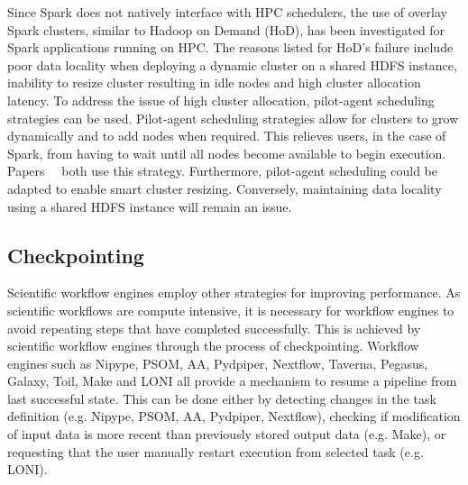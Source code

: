             Since Spark does not natively interface with HPC schedulers, the use
            of overlay Spark clusters, similar to Hadoop on Demand (HoD), has
            been investigated for Spark applications running on HPC. The reasons
            listed for HoD's failure include poor data locality when deploying a
            dynamic cluster on a shared HDFS instance, inability to resize
            cluster resulting in idle nodes and high cluster allocation latency.
            To address the issue of high cluster allocation, pilot-agent
            scheduling strategies can be used. Pilot-agent scheduling strategies
            allow for clusters to grow dynamically and to add nodes when
            required. This relieves users, in the case of Spark, from having to
            wait until all nodes become available to begin execution.
            Papers~\cite{7530058}~\cite{Baer:2015:IAS:2792745.2792779} both use
            this strategy. Furthermore, pilot-agent scheduling could be adapted
            to enable smart cluster resizing. Conversely, maintaining data
            locality using a shared HDFS instance will remain an issue. 
         

        \subsection{Checkpointing}\label{other}
        
                                                                                
            Scientific workflow engines employ other strategies for improving   
            performance. As scientific workflows are compute intensive, it is    
            necessary for workflow engines to avoid repeating steps that have   
            completed successfully. This is achieved by scientific workflow     
            engines through the process of checkpointing. Workflow engines such
            as Nipype, PSOM, AA, Pydpiper, Nextflow, Taverna, Pegasus, Galaxy,  
            Toil, Make and LONI all provide a mechanism to resume a pipeline    
            from last successful state. This can be done either by detecting    
            changes in the task definition (e.g. Nipype, PSOM, AA, Pydpiper,    
            Nextflow), checking if modification of input                        
            data is more recent than previously stored output data (e.g. Make),
            or requesting that the user manually restart execution from         
            selected task (e.g. LONI).                                          
                                                                                
